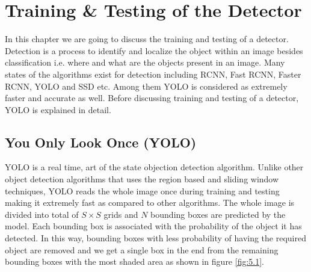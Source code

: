 \chapter{Training \& Testing of the
Detector}
\label{Chapter 5}
In this chapter we are going to discuss the training and testing of a detector. Detection is a process to identify and localize the object within an image besides classification i.e. where and what are the objects present in an image. Many states of the algorithms exist for detection including RCNN, Fast RCNN, Faster RCNN, YOLO and SSD etc. Among them YOLO is considered as extremely faster and accurate as well. Before discussing training and testing of a detector, YOLO  is explained in detail.
\section{You Only Look Once (YOLO)}
YOLO is a real time, art of the state objection detection algorithm. Unlike other object detection algorithms that uses the region based and sliding window techniques, YOLO reads the whole image once during training and testing making it extremely fast as compared to other algorithms. The whole image is divided into total of $S \times S$ grids and $N$ bounding boxes are predicted by the model. Each bounding box is associated with the probability of the object it has detected. In this way, bounding boxes with less probability of having the required object are removed and we get a single box in the end from the remaining bounding boxes with the most shaded area as shown in figure \ref{fig:5.1}.

